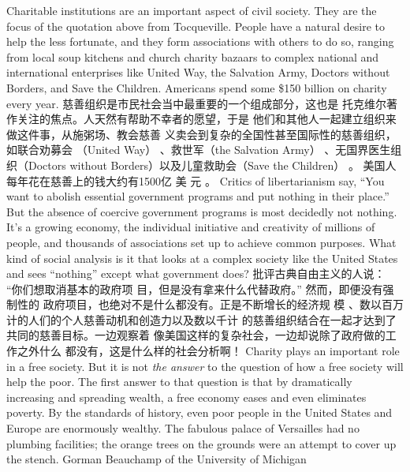 \begin{paracol}{2}
Charitable institutions are an important aspect of civil society.
They are the focus of the quotation above from Tocqueville.
People have a natural desire to help the less fortunate, and they
form associations with others to do so, ranging from local soup
kitchens and church charity bazaars to complex national and international enterprises like United Way, the Salvation Army,
Doctors without Borders, and Save the Children. Americans
spend some \$150 billion on charity every year.
\switchcolumn
慈善组织是市民社会当中最重要的一个组成部分，这也是
托克维尔著作关注的焦点。人天然有帮助不幸者的愿望，于是
他们和其他人一起建立组织来做这件事，从施粥场、教会慈善
义卖会到复杂的全国性甚至国际性的慈善组织，如联合劝募会
（United Way） 、救世军（the Salvation Army） 、无国界医生组织（Doctors without Borders）以及儿童救助会（Save the Children） 。 美国人每年花在慈善上的钱大约有1500亿 美 元 。
\switchcolumn*
Critics of libertarianism say, ``You want to abolish essential
government programs and put nothing in their place.'' But the
absence of coercive government programs is most decidedly not
nothing. It's a growing economy, the individual initiative and
creativity of millions of people, and thousands of associations
set up to achieve common purposes. What kind of social analysis is it that looks at a complex society like the United States
and sees ``nothing'' except what government does?
\switchcolumn
批评古典自由主义的人说： “你们想取消基本的政府项
目，但是没有拿来什么代替政府。” 然而，即便没有强制性的
政府项目，也绝对不是什么都没有。正是不断增长的经济规
模 、数以百万计的人们的个人慈善动机和创造力以及数以千计
的慈善组织结合在一起才达到了共同的慈善目标。一边观察着
像美国这样的复杂社会，一边却说除了政府做的工作之外什么
都没有，这是什么样的社会分析啊！
\switchcolumn*
Charity plays an important role in a free society. But it is not
\textit{the answer} to the question of how a free society will help the
poor. The first answer to that question is that by dramatically
increasing and spreading wealth, a free economy eases and even
eliminates poverty. By the standards of history, even poor people in the United States and Europe are enormously wealthy.
The fabulous palace of Versailles had no plumbing facilities; the
orange trees on the grounds were an attempt to cover up the
stench. Gorman Beauchamp of the University of Michigan

\end{paracol}
